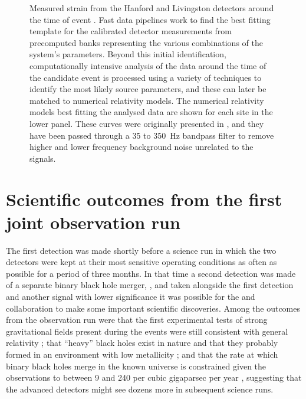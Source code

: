 \begin{figure}
  \centering
  
  \caption[Measured strain from the LIGO Hanford and Livingston detectors around the time of event \GWFIRSTEVENT{}]{\label{fig:gw150914}Measured strain from the \LIGO{} Hanford and Livingston detectors around the time of event \GWFIRSTEVENT{}. Fast data pipelines work to find the best fitting template for the calibrated detector measurements from precomputed banks representing the various combinations of the system's parameters. Beyond this initial identification, computationally intensive analysis of the data around the time of the candidate event is processed using a variety of techniques to identify the most likely source parameters, and these can later be matched to numerical relativity models. The numerical relativity models best fitting the analysed data are shown for each site in the lower panel. These curves were originally presented in \cite{Abbott2016}, and they have been passed through a \num{35} to \SI{350}{\hertz} bandpass filter to remove higher and lower frequency background noise unrelated to the signals.}
\end{figure}

\section{Scientific outcomes from the first joint observation run}
The first detection was made shortly before a science run in which the two \LIGO{} detectors were kept at their most sensitive operating conditions as often as possible for a period of three months. In that time a second detection was made of a separate binary black hole merger, \GWSECONDEVENT{} \cite{Abbott2016b}, and taken alongside the first detection and another signal with lower significance it was possible for the \LSC{} and \VIRGO{} collaboration to make some important scientific discoveries. Among the outcomes from the observation run were that the first experimental tests of strong gravitational fields present during the events were still consistent with general relativity \cite{Abbott2016c}; that ``heavy'' black holes exist in nature and that they probably formed in an environment with low metallicity \cite{Abbott2016d}; and that the rate at which binary black holes merge in the known universe is constrained given the observations to between 9 and 240 per cubic gigaparsec per year \cite{lscvirgoo1}, suggesting that the advanced detectors might see dozens more in subsequent science runs.

